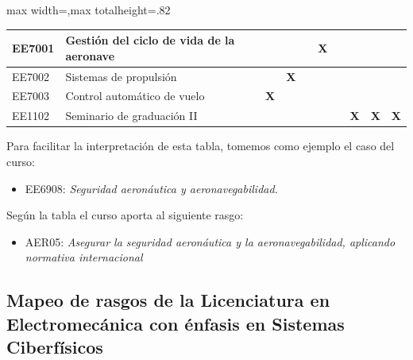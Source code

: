\begin{center}
\begin{adjustbox}{max width=\textwidth,max totalheight=.82\textheight}
\begin{tabular}{|l|p{4.6cm}|c|c|c|c|c|c|c|c|}
EE7001 & Gestión del ciclo de vida de la aeronave & \textbf{ } & \textbf{ } & \textbf{ } & \textbf{X} & \textbf{ } & \textbf{ } & \textbf{ } & \textbf{ } \\ \hline
\rowcolor{azulTabla}
EE7002 & Sistemas de propulsión & \textbf{ } & \textbf{X} & \textbf{ } & \textbf{ } & \textbf{ } & \textbf{ } & \textbf{ } & \textbf{ } \\ \hline
EE7003 & Control automático de vuelo & \textbf{X} & \textbf{ } & \textbf{ } & \textbf{ } & \textbf{ } & \textbf{ } & \textbf{ } & \textbf{ } \\ \hline
\rowcolor{azulTabla}
EE1102 & Seminario de graduación II & \textbf{ } & \textbf{ } & \textbf{ } & \textbf{ } & \textbf{ } & \textbf{X} & \textbf{X} & \textbf{X} \\ \hline
\end{tabular}
\end{adjustbox}
\end{center}

Para facilitar la interpretación de esta tabla, tomemos como ejemplo el caso del curso:\par

\begin{itemize}
\item EE6908: \textit{Seguridad aeronáutica y aeronavegabilidad}\textit{.}
\end{itemize}
Según la tabla el curso aporta al siguiente rasgo:\par

\begin{itemize}
\item AER05: \textit{Asegurar la seguridad aeronáutica y la aeronavegabilidad, aplicando normativa internacional}
\end{itemize}
\subsection*{Mapeo de rasgos de la Licenciatura en Electromecánica con énfasis en Sistemas Ciberfísicos}

